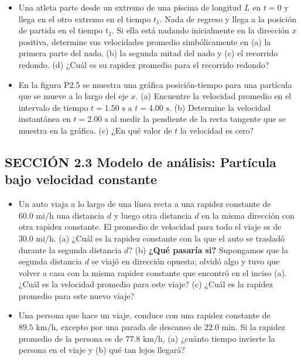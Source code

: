 \documentclass[11pt,a4paper]{article}
\begin{document}
\begin{itemize}
    \item[\textbf{4.}] Una atleta parte desde un extremo de una piscina de longitud $L$ en $t = 0$ y llega en el otro extremo en el tiempo $t_1$. Nada de regreso y llega a la posición de partida en el tiempo $t_2$. Si ella está nadando inicialmente en la dirección $x$ positiva, determine sus velocidades promedio simbólicamente en (a) la primera parte del nado, (b) la segunda mitad del nado y (c) el recorrido redondo. (d) ¿Cuál es su rapidez promedio para el recorrido redondo?
    \vspace*{7cm}

    \item[\textbf{5.}] En la figura P2.5 se muestra una gráfica posición-tiempo para una partícula que se mueve a lo largo del eje $x$. (a) Encuentre la velocidad promedio en el intervalo de tiempo $t = 1.50 \text{ s}$ a $t = 4.00 \text{ s}$. (b) Determine la velocidad instantánea en $t = 2.00 \text{ s}$ al medir la pendiente de la recta tangente que se muestra en la gráfica. (c) ¿En qué valor de $t$ la velocidad es cero?
    \vspace*{7cm}
\end{itemize}

\newpage

\subsection*{SECCIÓN 2.3 Modelo de análisis: Partícula bajo velocidad constante}

\begin{itemize}
    \item[\textbf{6.}] Un auto viaja a lo largo de una línea recta a una rapidez constante de $60.0 \text{ mi/h}$ una distancia $d$ y luego otra distancia $d$ en la misma dirección con otra rapidez constante. El promedio de velocidad para todo el viaje es de $30.0 \text{ mi/h}$. (a) ¿Cuál es la rapidez constante con la que el auto se trasladó durante la segunda distancia $d$? (b) \textbf{¿Qué pasaría si?} Supongamos que la segunda distancia $d$ se viajó en dirección opuesta; olvidó algo y tuvo que volver a casa con la misma rapidez constante que encontró en el inciso (a). ¿Cuál es la velocidad promedio para este viaje? (c) ¿Cuál es la rapidez promedio para este nuevo viaje?
    \vspace*{7cm}

    \item[\textbf{7.}] Una persona que hace un viaje, conduce con una rapidez constante de $89.5 \text{ km/h}$, excepto por una parada de descanso de $22.0 \text{ min}$. Si la rapidez promedio de la persona es de $77.8 \text{ km/h}$, (a) ¿cuánto tiempo invierte la persona en el viaje y (b) qué tan lejos llegará?
    \vspace*{6cm}
\end{itemize}
\end{document}
